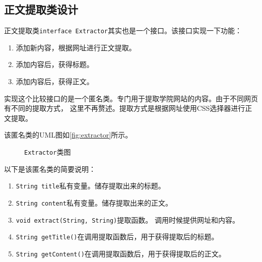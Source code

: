 \documentclass[UTF8,a4paper,12pt]{ctexart}
\begin{document}
\subsection{正文提取类设计}
正文提取类\texttt{interface Extractor}其实也是一个接口。该接口实现一下功能：
\begin{enumerate}[label=(\arabic*), wide=2em]
\item 添加新内容，根据网址进行正文提取。
\item 添加内容后，获得标题。
\item 添加内容后，获得正文。
\end{enumerate}\par
实现这个比较接口的是一个匿名类。专门用于提取学院网站的内容。由于不同网页有不同的提取方式，
这里不再赘述。提取方式是根据网址使用CSS选择器进行正文提取。\par
该匿名类的UML图如\autoref{fig:extractor}所示。\par
\begin{figure}[htbp]
\centering
{}
\caption{\texttt{Extractor}类图}
\label{fig:extractor}
\end{figure}
以下是该匿名类的简要说明：
\begin{enumerate}[label=(\arabic*), wide=2em]
    \item \texttt{String title}私有变量。储存提取出来的标题。
    \item \texttt{String content}私有变量。储存提取出来的正文。
    \item \texttt{void extract(String, String)}提取函数。
    调用时候提供网址和内容。
    \item \texttt{String getTitle()}在调用提取函数后，用于获得提取后的标题。
    \item \texttt{String getContent()}在调用提取函数后，用于获得提取后的正文。
\end{enumerate}\par
\end{document}
